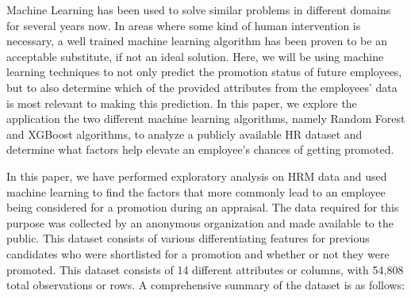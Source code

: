 \documentclass[runningheads]{llncs}
\begin{document}
Machine Learning has been used to solve similar problems in different
domains for several years now. In areas where some kind of human
intervention is necessary, a well trained machine learning algorithm has
been proven to be an acceptable substitute, if not an ideal solution.
Here, we will be using machine learning techniques to not only predict
the promotion status of future employees, but to also determine which of
the provided attributes from the employees' data is most relevant to
making this prediction. In this paper, we explore the application the
two different machine learning algorithms, namely Random
Forest\cite{ref_Breiman2001} and
XGBoost\cite{ref_ChenG16} algorithms, to analyze a
publicly available HR dataset and determine what factors help elevate an
employee's chances of getting promoted.

In this paper, we have performed exploratory analysis on HRM data and
used machine learning to find the factors that more commonly lead to an
employee being considered for a promotion during an appraisal. The data
required for this purpose was collected by an anonymous organization and
made available to the public. This dataset consists of various
differentiating features for previous candidates who were shortlisted
for a promotion and whether or not they were promoted. This dataset
consists of 14 different attributes or columns, with 54,808 total
observations or rows. A comprehensive summary of the dataset is as
follows:
\end{document}
